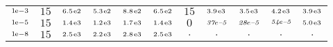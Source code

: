 \begin{tiny}
\begin{tabular}{@{$\;$}c@{$\;$}|@{$\;$}c@{$\;$}@{$\;$}c@{$\;$}@{$\;$}c@{$\;$}@{$\;$}c@{$\;$}@{$\;$}c@{$\;$}|@{$\;$}c@{$\;$}@{$\;$}c@{$\;$}@{$\;$}c@{$\;$}@{$\;$}c@{$\;$}@{$\;$}c@{$\;$}}
$\scriptstyle1\!\mathrm{\hspace{0.10em}e}-3$ & $\scriptstyle15$ & $\scriptstyle6.5\mathrm{\hspace{0.10em}e}2$ & $\scriptstyle5.3\mathrm{\hspace{0.10em}e}2$ & $\scriptstyle8.8\mathrm{\hspace{0.10em}e}2$ & $\scriptstyle6.5\mathrm{\hspace{0.10em}e}2$ & $\scriptstyle15$ & $\scriptstyle3.9\mathrm{\hspace{0.10em}e}3$ & $\scriptstyle3.5\mathrm{\hspace{0.10em}e}3$ & $\scriptstyle4.2\mathrm{\hspace{0.10em}e}3$ & $\scriptstyle3.9\mathrm{\hspace{0.10em}e}3$\\ 
$\scriptstyle1\!\mathrm{\hspace{0.10em}e}-5$ & $\scriptstyle15$ & $\scriptstyle1.4\mathrm{\hspace{0.10em}e}3$ & $\scriptstyle1.2\mathrm{\hspace{0.10em}e}3$ & $\scriptstyle1.7\mathrm{\hspace{0.10em}e}3$ & $\scriptstyle1.4\mathrm{\hspace{0.10em}e}3$ & $\scriptstyle0$ & $\scriptstyle\textit{37}\hspace{0.00em}e\textit{--5}$ & $\scriptstyle\textit{28}\hspace{0.00em}e\textit{--5}$ & $\scriptstyle\textit{54}\hspace{0.00em}e\textit{--5}$ & $\scriptstyle5.0\mathrm{\hspace{0.10em}e}3$\\ 
$\scriptstyle1\!\mathrm{\hspace{0.10em}e}-8$ & $\scriptstyle15$ & $\scriptstyle2.5\mathrm{\hspace{0.10em}e}3$ & $\scriptstyle2.2\mathrm{\hspace{0.10em}e}3$ & $\scriptstyle2.8\mathrm{\hspace{0.10em}e}3$ & $\scriptstyle2.5\mathrm{\hspace{0.10em}e}3$ & $\scriptstyle.$ & $\scriptstyle.$ & $\scriptstyle.$ & $\scriptstyle.$ & $\scriptstyle.$\\ 
\end{tabular} 
\end{tiny} 
